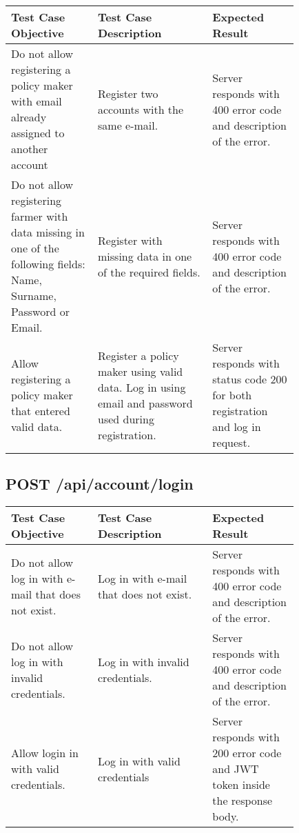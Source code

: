 \begin{longtable}{p{0.25\linewidth}p{0.33\linewidth}p{0.25\linewidth}}
	\toprule
	\textbf{Test Case Objective}  & \textbf{Test Case Description} & \textbf{Expected Result}\\
	\midrule
	Do not allow registering a policy maker with email already assigned to another account & Register two accounts with the same e-mail. & Server responds with 400 error code and description of the error. \\
	 Do not allow registering farmer with data missing in one of the following fields: Name, Surname, Password or Email. & Register with missing data in one of the required fields. & Server responds with 400 error code and description of the error.\\
	 Allow registering a policy maker that entered valid data. & Register a policy maker using valid data. Log in using email and password used during registration. & Server responds with status code 200 for both registration and log in request.\\
	\bottomrule
\end{longtable}

\subsection{POST \slash api\slash account\slash login}
\begin{longtable}{p{0.25\linewidth}p{0.33\linewidth}p{0.25\linewidth}}
	\toprule
	\textbf{Test Case Objective}   & \textbf{Test Case Description} & \textbf{Expected Result}\\
	\midrule
	Do not allow log in with e-mail that does not exist. & Log in with e-mail that does not exist. &  Server responds with 400 error code and description of the error.\\
	Do not allow log in with invalid credentials. & Log in with invalid credentials. &  Server responds with 400 error code and description of the error.\\
	Allow login in with valid credentials. & Log in with valid credentials  &  Server responds with 200 error code and JWT token inside the response body.\\
	\bottomrule
\end{longtable}

